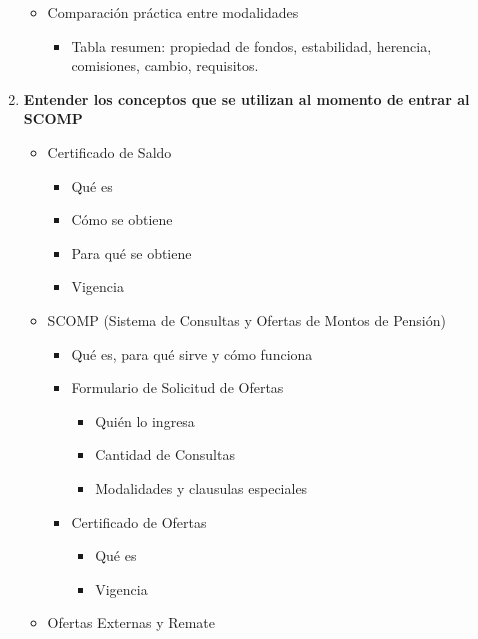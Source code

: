 \begin{enumerate}
\begin{itemize}
\begin{itemize}
    \end{itemize}
    \item Comparación práctica entre modalidades
    \begin{itemize}
        \item Tabla resumen: propiedad de fondos, estabilidad, herencia, comisiones, cambio, requisitos.
    \end{itemize}
\end{itemize}

\item \textbf{Entender los conceptos que se utilizan al momento de entrar al SCOMP }
\begin{itemize}
    \item Certificado de Saldo
    \begin{itemize}
        \item Qué es
        \item Cómo se obtiene
        \item Para qué se obtiene 
        \item Vigencia
    \end{itemize}
    \item SCOMP (Sistema de Consultas y Ofertas de Montos de Pensión) 
    \begin{itemize}
        \item Qué es, para qué sirve y cómo funciona
        \item Formulario de Solicitud de Ofertas
        \begin{itemize}
            \item Quién lo ingresa
            \item Cantidad de Consultas
            \item Modalidades y clausulas especiales
        \end{itemize}
        \item Certificado de Ofertas
        \begin{itemize}
            \item Qué es 
            \item Vigencia 
        \end{itemize}
    \end{itemize}
    \item Ofertas Externas y Remate

\end{itemize}
\end{enumerate}
